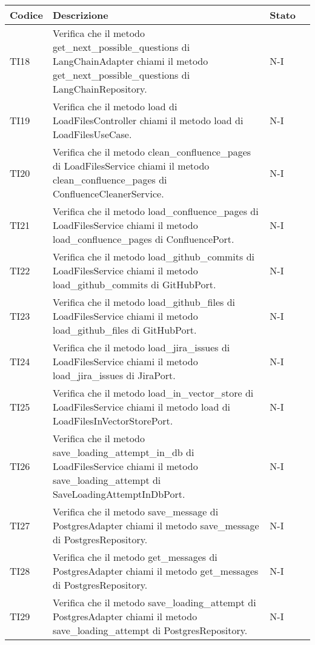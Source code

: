 \begin{table}[h!]
    \centering
    \renewcommand{\arraystretch}{1.5}
    \begin{tabularx}{\textwidth}{|p{}|X|p{}|p{}|}\hline
    \rowcolor[HTML]{FFD700}
    \textbf{Codice} & \textbf{Descrizione} & \textbf{Stato} \\ \hline
    TI18 & Verifica che il metodo get\_next\_possible\_questions di LangChainAdapter chiami il metodo get\_next\_possible\_questions di LangChainRepository. &  N-I \\ \hline
    TI19 & Verifica che il metodo load di LoadFilesController chiami il metodo load di LoadFilesUseCase. &  N-I \\ \hline
    TI20 & Verifica che il metodo clean\_confluence\_pages di LoadFilesService chiami il metodo clean\_confluence\_pages di ConfluenceCleanerService. &  N-I \\ \hline
    TI21 & Verifica che il metodo load\_confluence\_pages di LoadFilesService chiami il metodo load\_confluence\_pages di ConfluencePort. &  N-I \\ \hline
    TI22 & Verifica che il metodo load\_github\_commits di LoadFilesService chiami il metodo load\_github\_commits di GitHubPort. &  N-I \\ \hline
    TI23 & Verifica che il metodo load\_github\_files di LoadFilesService chiami il metodo load\_github\_files di GitHubPort. &  N-I \\ \hline
    TI24 & Verifica che il metodo load\_jira\_issues di LoadFilesService chiami il metodo load\_jira\_issues di JiraPort. &  N-I \\ \hline
    TI25 & Verifica che il metodo load\_in\_vector\_store di LoadFilesService chiami il metodo load di LoadFilesInVectorStorePort. &  N-I \\ \hline
    TI26 & Verifica che il metodo save\_loading\_attempt\_in\_db di LoadFilesService chiami il metodo save\_loading\_attempt di SaveLoadingAttemptInDbPort. &  N-I \\ \hline
    TI27 & Verifica che il metodo save\_message di PostgresAdapter chiami il metodo save\_message di PostgresRepository. &  N-I \\ \hline
    TI28 & Verifica che il metodo get\_messages di PostgresAdapter chiami il metodo get\_messages di PostgresRepository. & N-I \\ \hline
    TI29 & Verifica che il metodo save\_loading\_attempt di PostgresAdapter chiami il metodo save\_loading\_attempt di PostgresRepository. &  N-I \\ \hline

\end{tabularx}
\end{table}
